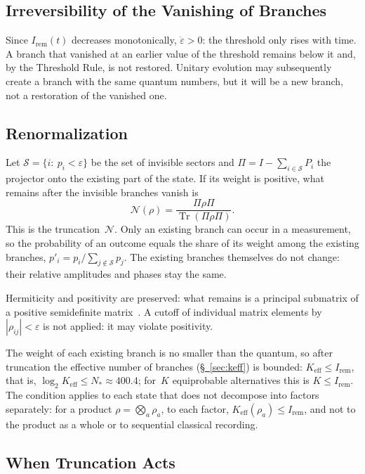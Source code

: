 \documentclass[11pt,a4paper]{article}
\newcommand{\Ost}{I_{\mathrm{rem}}}
\newcommand{\Keff}{K_{\mathrm{eff}}}
\newcommand{\Sinv}{\mathcal{S}}
\newcommand{\CollapseRuleD}{the Threshold Rule}
\begin{document}
\subsection{Irreversibility of the Vanishing of Branches}
\label{sec:irreversible}

Since $\Ost(t)$ decreases monotonically, $\dot\varepsilon>0$: the threshold only rises with time. A branch that vanished at an earlier value of the threshold remains below it and, by \CollapseRuleD{}, is not restored. Unitary evolution may subsequently create a branch with the same quantum numbers, but it will be a new branch, not a restoration of the vanished one.

\subsection{Renormalization}
\label{sec:renorm}

Let $\Sinv=\{i:\ p_i<\varepsilon\}$ be the set of invisible sectors and $\Pi=I-\sum_{i\in \Sinv}P_i$ the projector onto the existing part of the state. If its weight is positive, what remains after the invisible branches vanish is
\begin{equation}
\mathcal{N}(\rho)
=\frac{\Pi\rho \Pi}{\operatorname{Tr}(\Pi\rho \Pi)}.
\end{equation}
This is the truncation~$\mathcal N$. Only an existing branch can occur in a measurement, so the probability of an outcome equals the share of its weight among the existing branches, $p'_i=p_i/\sum_{j\notin \Sinv}p_j$. The existing branches themselves do not change: their relative amplitudes and phases stay the same.

Hermiticity and positivity are preserved: what remains is a principal submatrix of a positive semidefinite matrix~\cite{hornjohnson2013}. A cutoff of individual matrix elements by~$|\rho_{ij}|<\varepsilon$ is not applied: it may violate positivity.

The weight of each existing branch is no smaller than the quantum, so after truncation the effective number of branches (\hyperref[sec:keff]{\S~\ref*{sec:keff}}) is bounded: $\Keff\le\Ost$, that is, $\log_2\Keff\le N_*\approx400.4$; for~$K$ equiprobable alternatives this is $K\le\Ost$. The condition applies to each state that does not decompose into factors separately: for a product $\rho=\bigotimes_a\rho_a$, to each factor, $\Keff(\rho_a)\le\Ost$, and not to the product as a whole or to sequential classical recording.

\subsection{When Truncation Acts}
\label{sec:when}
\end{document}
